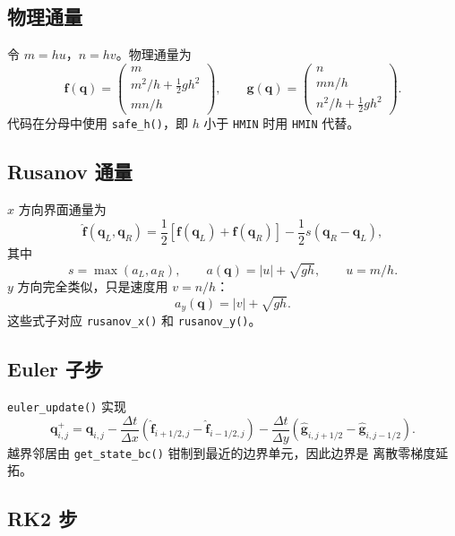 \documentclass[12pt,a4paper]{article}
\begin{document}
\subsection{物理通量}

令 $m=hu$，$n=hv$。物理通量为
\begin{equation}
\mathbf{f}(\mathbf{q}) =
\begin{pmatrix}
m\\
m^2/h+\frac12 g h^2\\
mn/h
\end{pmatrix},
\qquad
\mathbf{g}(\mathbf{q}) =
\begin{pmatrix}
n\\
mn/h\\
n^2/h+\frac12 g h^2
\end{pmatrix}.
\label{eq:physical-flux}
\end{equation}
代码在分母中使用 \texttt{safe\_h()}，即 $h$ 小于 \texttt{HMIN} 时用
\texttt{HMIN} 代替。

\subsection{Rusanov 通量}

$x$ 方向界面通量为
\begin{equation}
\widehat{\mathbf{f}}(\mathbf{q}_L,\mathbf{q}_R)
=
\frac12\left[\mathbf{f}(\mathbf{q}_L)+\mathbf{f}(\mathbf{q}_R)\right]
-\frac12 s(\mathbf{q}_R-\mathbf{q}_L),
\label{eq:rusanov-x}
\end{equation}
其中
\[
s=\max(a_L,a_R),
\qquad
a(\mathbf{q})=|u|+\sqrt{g h},
\qquad
u=m/h.
\]
$y$ 方向完全类似，只是速度用 $v=n/h$：
\[
a_y(\mathbf{q})=|v|+\sqrt{g h}.
\]
这些式子对应 \texttt{rusanov\_x()} 和 \texttt{rusanov\_y()}。

\subsection{Euler 子步}

\texttt{euler\_update()} 实现
\begin{equation}
\mathbf{q}_{i,j}^{+}
=
\mathbf{q}_{i,j}
-\frac{\Delta t}{\Delta x}
\left(
\widehat{\mathbf{f}}_{i+1/2,j}
-\widehat{\mathbf{f}}_{i-1/2,j}
\right)
-\frac{\Delta t}{\Delta y}
\left(
\widehat{\mathbf{g}}_{i,j+1/2}
-\widehat{\mathbf{g}}_{i,j-1/2}
\right).
\label{eq:euler}
\end{equation}
越界邻居由 \texttt{get\_state\_bc()} 钳制到最近的边界单元，因此边界是
离散零梯度延拓。

\subsection{RK2 步}
\end{document}
